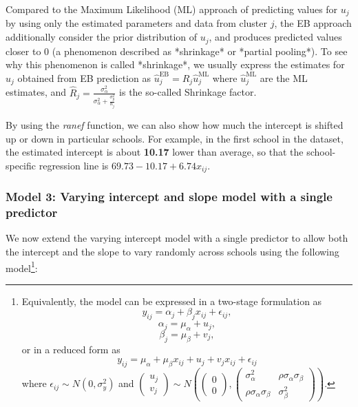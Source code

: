 Compared to the Maximum Likelihood (ML) approach of predicting values for $u_j$ by using only the estimated parameters and data from cluster $j$, the EB approach additionally consider the prior distribution of $u_{j}$, and produces predicted values closer to $0$ (a phenomenon described as *shrinkage* or *partial pooling*).  To see why this phenomenon is called *shrinkage*, we usually express the estimates for $u_j$ obtained from EB prediction as $\hat{u}_j^{\text{EB}} = \hat{R}_j\hat{u}_j^{\text{ML}}$ where $\hat{u}_j^{\text{ML}}$ are the ML estimates, and $\hat{R}_j = \frac{\sigma_\alpha^2}{\sigma_\alpha^2 + \frac{\sigma_y^2}{n_j}}$ is the so-called Shrinkage factor.

By using the \textit{ranef} function, we can also show how much the intercept is shifted up or down in particular schools. For example, in the first school in the dataset, the estimated intercept is about \textbf{10.17} lower than average, so that the school-specific regression line is $69.73 - 10.17 + 6.74 x_{ij}$.

\subsubsection*{Model 3: Varying intercept and slope model with a single predictor}
We now extend the varying intercept model with a single predictor to allow both the intercept and the slope to vary randomly across schools using the following model\footnote{Equivalently, the model can be expressed in a two-stage formulation as $$y_{ij} = \alpha_j + \beta_j x_{ij} +\epsilon_{ij},$$ $$\alpha_j = \mu_\alpha + u_j,$$ $$\beta_j = \mu_\beta + v_j,$$ or in a reduced form as $$y_{ij} = \mu_\alpha + \mu_\beta x_{ij} + u_j + v_j x_{ij} + \epsilon_{ij}$$ where $\epsilon_{ij} \sim N(0, \sigma_{y}^{2})$ and $\left( \begin{matrix} u_j \\ v_j \end{matrix} \right) \sim N\left( \left( \begin{matrix} 0 \\ 0 \end{matrix} \right) ,\left( \begin{matrix} { \sigma  }_{ \alpha  }^{ 2 } & \rho { \sigma  }_{ \alpha  }{ \sigma  }_{ \beta  } \\ \rho { \sigma  }_{ \alpha  }{ \sigma  }_{ \beta  } & { \sigma  }_{ \beta  }^{ 2 } \end{matrix} \right)  \right)$.}:

